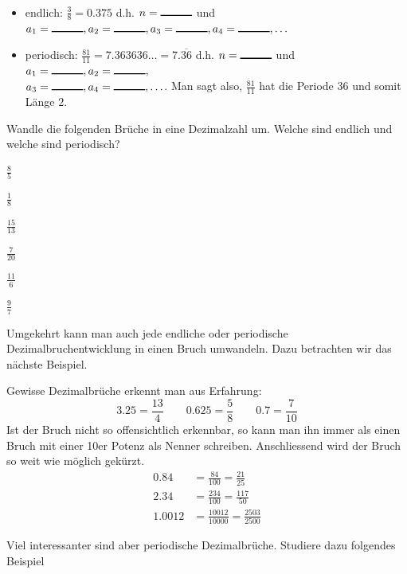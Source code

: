 \documentclass[11pt,oneside]{article}
\begin{document}
    \begin{beispiel}\
        \begin{itemize}
            \item endlich: $\frac{3}{8}=0.375$ d.h. $n=\gap{1}$ und $a_1=\gap{1},a_2=\gap{1},a_3=\gap{1},a_4=\gap{1},\ldots$
            \item periodisch: $\frac{81}{11}=7.363636\ldots=7.\overline{36}$ d.h. $n=\gap{1}$ und $a_1=\gap{1},a_2=\gap{1},$\\$a_3=\gap{1},a_4=\gap{1},\ldots$. Man sagt also, $\frac{81}{11}$ hat die Periode $36$ und somit Länge $2$.
        \end{itemize}
    \end{beispiel}
    \begin{aufgabe}
        Wandle die folgenden Brüche in eine Dezimalzahl um. Welche sind endlich und welche sind periodisch?
        \begin{enumcols}[3]
            \item $\displaystyle\frac{8}{5}$
            \item $\displaystyle\frac{1}{8}$
            \item $\displaystyle\frac{15}{13}$
            \item $\displaystyle\frac{7}{20}$
            \item $\displaystyle\frac{11}{6}$
            \item $\displaystyle\frac{9}{7}$
        \end{enumcols}
    \end{aufgabe}
    Umgekehrt kann man auch jede endliche oder periodische Dezimalbruchentwicklung in einen Bruch umwandeln. Dazu betrachten wir das nächste Beispiel.
    \begin{beispiel}
    	Gewisse Dezimalbrüche erkennt man \glqq aus Erfahrung\grqq:
    		\[3.25 = \frac{13}{4} \qquad 0.625 = \frac{5}{8} \qquad 0.7 = \frac{7}{10}\]
    		Ist der Bruch nicht so offensichtlich erkennbar, so kann man ihn immer als einen Bruch mit einer 10er Potenz als Nenner schreiben. Anschliessend wird der Bruch so weit wie möglich gekürzt.
    		\begin{align*}
    			0.84 &= \frac{84}{100} = \frac{21}{25} \\
    			2.34 &= \frac{234}{100} = \frac{117}{50} \\
    			1.0012 &= \frac{10012}{10000} = \frac{2503}{2500}
    		\end{align*}
    \end{beispiel}
    Viel interessanter sind aber periodische Dezimalbrüche. Studiere dazu folgendes Beispiel
\end{document}
